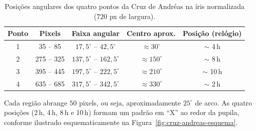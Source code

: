 \documentclass[11pt,a4paper]{article}
\begin{document}
\begin{table}[H]
\centering
\caption{Posições angulares dos quatro pontos da Cruz de Andréas na íris normalizada (\(720\) px de largura).}
\label{tab:cruz-andreas-posicoes}
\small
\setlength{\tabcolsep}{5pt}
\renewcommand{\arraystretch}{1.15}
\begin{tabular}{ccccc}
\toprule
\textbf{Ponto} & \textbf{Pixels} & \textbf{Faixa angular} & \textbf{Centro aprox.} & \textbf{Posição (relógio)} \\
\midrule
1 & 35 -- 85   & \(17{,}5^\circ\) -- \(42{,}5^\circ\)   & \(\approx 30^\circ\)   & \(\sim\) 4\,h \\
2 & 275 -- 325 & \(137{,}5^\circ\) -- \(162{,}5^\circ\) & \(\approx 150^\circ\)  & \(\sim\) 8\,h \\
3 & 395 -- 445 & \(197{,}5^\circ\) -- \(222{,}5^\circ\) & \(\approx 210^\circ\)  & \(\sim\) 10\,h \\
4 & 635 -- 685 & \(317{,}5^\circ\) -- \(342{,}5^\circ\) & \(\approx 330^\circ\)  & \(\sim\) 2\,h \\
\bottomrule
\end{tabular}
\end{table}

Cada região abrange \(50\) pixels, ou seja, aproximadamente \(25^\circ\) de arco. As quatro posições (2\,h, 4\,h, 8\,h e 10\,h) formam um padrão em ``X'' ao redor da pupila, conforme ilustrado esquematicamente na Figura~\ref{fig:cruz-andreas-esquema}.
\end{document}
